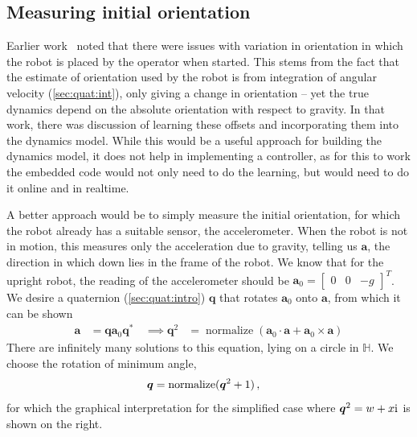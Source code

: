 \documentclass[main.tex]{subfiles}
\begin{document}
\subsection{Measuring initial orientation}
\label{sec:acc:orient}
	Earlier work~\cite{aleksi} noted that there were issues with variation in orientation in which the robot is placed by the operator when started.
	This stems from the fact that the estimate of orientation used by the robot is from integration of angular velocity (\cref{sec:quat:int}), only giving a change in orientation -- yet the true dynamics depend on the absolute orientation with respect to gravity.
	In that work, there was discussion of learning these offsets and incorporating them into the dynamics model.
	While this would be a useful approach for building the dynamics model, it does not help in implementing a controller, as for this to work the embedded code would not only need to do the learning, but would need to do it online and in realtime.

	A better approach would be to simply measure the initial orientation, for which the robot already has a suitable sensor, the accelerometer. When the robot is not in motion, this measures only the acceleration due to gravity, telling us $\bm{a}$, the direction in which down lies in the frame of the robot.
	We know that for the upright robot, the reading of the accelerometer should be $\bm{a}_0 = \begin{bmatrix}0 & 0 & -g\end{bmatrix}^T$\footnotemark. We desire a quaternion (\cref{sec:quat:intro}) $\bm{q}$ that rotates $\bm{a}_0$ onto $\bm{a}$, from which it can be shown
	\begin{align}
		\bm{a} &= \bm{q}\bm{a}_0\bm{q}^*\, & \implies
		\bm{q}^2
			&= \operatorname{normalize}\left(
				\bm{a}_0 \cdot \bm{a} + \bm{a}_0 \times \bm{a}
			\right)
			\label{eq:quat-sqrt}
	\end{align}
	There are infinitely many solutions to this equation, lying on a circle in $\mathbb{H}$.
	We choose the rotation of minimum angle,
	\begin{align}
		\bm{q} &= \operatorname{normalize}(\bm{q}^2 + 1)\,, &
		\parbox{\linewidth/5}{%
			
		}
	\end{align}
	for which the  graphical interpretation for the simplified case where $\bm{q}^2 = w + x\mathrm{i}\mkern1mu$ is shown on the right.
\end{document}
